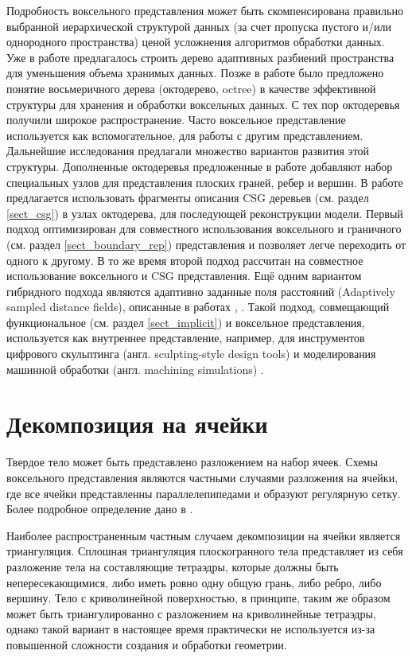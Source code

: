 Подробность воксельного представления может быть скомпенсирована правильно выбранной иерархической структурой данных (за счет пропуска пустого и/или однородного пространства) ценой усложнения алгоритмов обработки данных. Уже в работе \cite{REDD78} предлагалось строить дерево адаптивных разбиений пространства для уменьшения объема хранимых данных. Позже в работе \cite{Meagher82} было предложено понятие восьмеричного дерева (октодерево, octree) в качестве эффективной структуры для хранения и обработки воксельных данных. С тех пор октодеревья получили широкое распространение. Часто воксельное представление используется как вспомогательное, для работы с другим представлением. Дальнейшие исследования предлагали множество вариантов развития этой структуры. Дополненные октодеревья предложенные в работе \cite{brunet1990solid} добавляют набор специальных узлов для представления плоских граней, ребер и вершин. В работе \cite{dyllong2007reliable} предлагается использовать фрагменты описания CSG деревьев (см. раздел \ref{sect_csg}) в узлах октодерева, для последующей реконструкции модели. Первый подход оптимизирован для совместного использования воксельного и граничного (см. раздел \ref{sect_boundary_rep}) представления и позволяет легче переходить от одного к другому. В то же время второй подход рассчитан на совместное использование воксельного и CSG представления. Ещё одним вариантом гибридного подхода являются адаптивно заданные поля расстояний (Adaptively sampled distance fields), описанные в работах \cite{frisken2000adaptively}, \cite{Figueiredo2001revisiting}. Такой подход, совмещающий функциональное (см. раздел \ref{sect_implicit}) и воксельное представления, используется как внутреннее представление, например, для инструментов цифрового скульптинга (англ. sculpting-style design tools) \cite{perry2001kizamu} и моделирования машинной обработки (англ. machining simulations) \cite{sullivan2012high}.

\section{Декомпозиция на ячейки} \label{sect_cell_decompositions}

Твердое тело может быть представлено разложением на набор ячеек. Схемы воксельного представления являются частными случаями разложения на ячейки, где все ячейки представленны параллелепипедами и образуют регулярную сетку. Более подробное определение дано в \cite{Requicha80}.

Наиболее распространенным частным случаем декомпозиции на ячейки является триангуляция. Сплошная триангуляция плоскогранного тела представляет из себя разложение тела на составляющие тетраэдры, которые должны быть непересекающимися, либо иметь ровно одну общую грань, либо ребро, либо вершину. Тело с криволинейной поверхностью, в принципе, таким же образом может быть триангулированно с разложением на криволинейные тетраэдры, однако такой вариант в настоящее время практически не используется из-за повышенной сложности создания и обработки геометрии.

